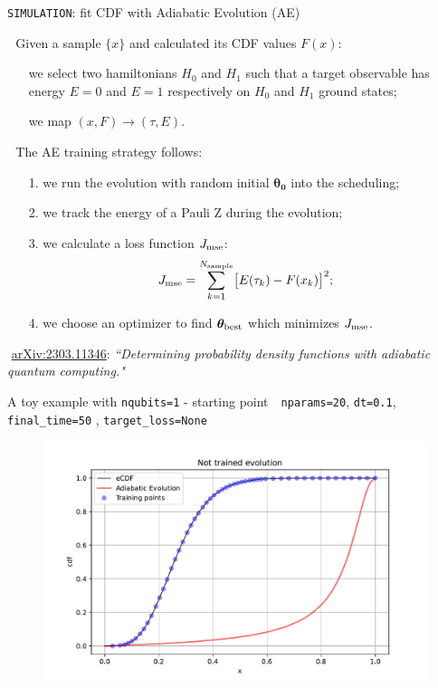 \documentclass[9pt, xcolor={svgnames}, hyperref={colorlinks, linkcolor=black, citecolor=amethyst, urlcolor=amethyst}]{beamer}
\begin{document}
\begin{frame}[fragile]{\texttt{SIMULATION}: fit CDF with Adiabatic Evolution (AE)}
\small

\faArrowCircleRight\,\, Given a sample $\{x\}$ and calculated its CDF values $F(x)$:
\pause
\begin{itemize}[noitemsep]
\item[\faChain] we select two hamiltonians $H_0$ and $H_1$ such that a target observable
has energy $E=0$ and $E=1$ respectively on $H_0$ and $H_1$ ground states;
\pause
\item[\faChain] we map $(x, F)\to(\tau, E)$.
\end{itemize}

\pause
\faArrowCircleRight\,\, The AE training strategy follows:
\begin{itemize}[noitemsep]
\pause
\item[1.] we run the evolution with random initial $\bm{\theta_0}$ into the scheduling;
\pause
\item[2.] we track the energy of a Pauli Z during the evolution;
\pause
\item[3.] we calculate a loss function $J_{\rm mse}$:
         $$ J_{\rm mse} = \sum_{k=1}^{N_{\rm sample}} \bigl[ E(\tau_k) - F(x_k) \bigr]^2; $$
\pause
\item[4.] we choose an optimizer to find $\bm{\theta}_{\rm best}$ which minimizes $J_{\rm mse}$.
\end{itemize} 
\pause
\vfill
\footnotesize
\faBook\,\,\href{https://arxiv.org/abs/2303.11346}{arXiv:2303.11346}: \textit{``Determining probability density functions with adiabatic quantum computing."}\\
\end{frame}

\begin{frame}[fragile]{A toy example with \texttt{nqubits=1} - starting point}
\large
\faArrowCircleRight\,\, \texttt{nparams=20}, \texttt{dt=0.1}, \texttt{final\_time=50}
, \texttt{target\_loss=None}
\begin{figure}
    \includegraphics[width=1\textwidth]{figures/ev0.pdf}
\end{figure}
\end{frame}
\end{document}

